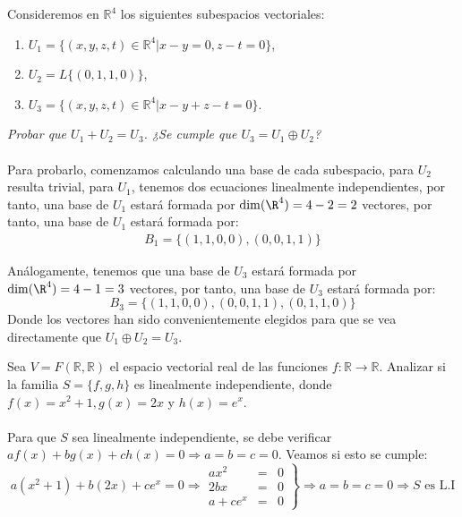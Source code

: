\begin{ejercicio}Consideremos en \( \mathbb{R}^4 \) los siguientes subespacios vectoriales:
	\begin{enumerate}
		\item \( U_1 = \{(x,y,z,t) \in \mathbb{R}^4 | x - y = 0, z - t = 0\} \),
		\item \( U_2 = L\{(0,1,1,0)\} \),
		\item \( U_3 = \{(x,y,z,t) \in \mathbb{R}^4 | x - y + z - t = 0\} \).
	\end{enumerate}
	\textit{Probar que \( U_1 + U_2 = U_3 \). ¿Se cumple que \( U_3 = U_1 \oplus U_2 \)?} \\ \\
	Para probarlo, comenzamos calculando una base de cada subespacio, para $U_2$ resulta trivial, para $U_1$, tenemos dos ecuaciones linealmente independientes, por tanto, una base de $U_1$ estará
	formada por $\dim(\R^4)=4-2=2$ vectores, por tanto, una base de $U_1$ estará formada por:
	\begin{align*}
		B_1 = \{(1,1,0,0),(0,0,1,1)\}
	\end{align*}

	Análogamente, tenemos que una base de $U_3$ estará formada por $\dim(\R^4)=4-1=3$ vectores, por tanto, una base de $U_3$ estará formada por:
	\begin{equation*}
		B_3 = \{(1,1,0,0),(0,0,1,1),(0,1,1,0)\}
	\end{equation*}
	Donde los vectores han sido convenientemente elegidos para que se vea directamente que $U_1 \oplus U_2 = U_3$.
\end{ejercicio}



\begin{ejercicio} Sea \( V = F(\mathbb{R},\mathbb{R}) \) el espacio vectorial real de las funciones \( f: \mathbb{R} \to \mathbb{R} \). Analizar si la familia \( S = \{f, g, h\} \) es linealmente independiente, donde \( f(x) = x^2 + 1, g(x) = 2x \) y \( h(x) = e^x \).
	\\ \\Para que $S$ sea linealmente independiente, se debe verificar $af(x)+bg(x)+ch(x)=0 \Rightarrow a=b=c=0$. Veamos si esto se cumple:
	\begin{equation*}
		a(x^2+1)+b(2x)+ce^x=0 \Rightarrow \left.
		\begin {array}{rcl}
		ax^2 & = & 0 \\
		2bx & = & 0 \\
		a+ce^x & = & 0
		\end {array}
		\right\} \Rightarrow a=b=c=0 \Rightarrow S \text{ es L.I}
	\end{equation*}
\end{ejercicio}




